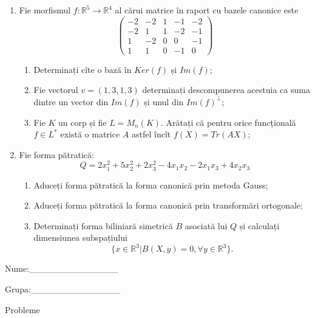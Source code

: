 \documentclass{article}
\begin{document}
\begin{enumerate}
 \item Fie morfismul $f:\mathbb{R}^5 \to \mathbb{R}^4$ al cărui matrice în raport cu bazele canonice este
$$\begin{pmatrix}
-2&-2&1&-1&-2\\
-2&1&1&-2&-1\\
1&-2&0&0&-1\\
1&1&0&-1&0
\end{pmatrix}$$

\begin{enumerate}
\item Determinați cîte o bază în $Ker(f)$ și $Im(f)$;
\item Fie vectorul $v=(1,3,1,3)$ determinați descompunerea acestuia ca suma dintre un vector din $Im(f)$ și unul din $Im(f)^\perp$;
\item Fie $K$ un corp și fie $L=M_n(K)$. Arătați că pentru orice funcțională $f \in L^*$ există o matrice $A$ astfel încît $f(X)=Tr(AX)$;
\end{enumerate}
\item Fie forma pătratică:
$$Q= 2x_1^2+5x_2^2+2x_3^2-4x_1x_2-2x_1x_3+4x_2x_3$$

\begin{enumerate}
\item Aduceți forma pătratică la forma canonică prin metoda Gauss;
\item Aduceți forma pătratică la forma canonică prin transformări ortogonale;
\item Determinați forma biliniară simetrică $B$ asociată lui $Q$ și calculați dimensiunea subspațiului
$$\{x \in \mathbb{R}^3 | B(X,y)=0,\forall y \in \mathbb{R}^3\}.$$

\end{enumerate}
\end{enumerate}
\newpage
\begin{flushright}
Nume:\_\_\_\_\_\_\_\_\_\_\_\_\_\_
 
 
Grupa:\_\_\_\_\_\_\_\_\_\_\_\_\_\_
\end{flushright}
\begin{center}
\vspace{2cm}
{\Large Probleme}
\vspace{2cm}
\end{center}
\end{document}
